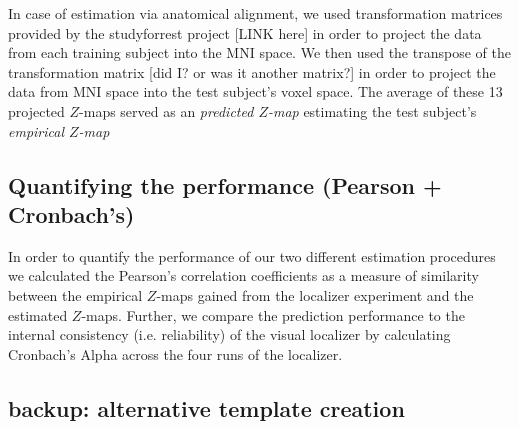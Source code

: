 




In case of estimation via anatomical alignment, we used transformation matrices
provided by the studyforrest project [LINK here] in order to project the data
from each training subject into the MNI space.
%
We then used the transpose of the transformation matrix [did I? or was it
another matrix?] in order to project the data from MNI space into the test
subject's voxel space.
%
The average of these 13 projected $Z$-maps served as an \textit{predicted
$Z$-map} estimating the test subject's \textit{empirical $Z$-map}


\subsection{Quantifying the performance (Pearson + Cronbach's)}

%
In order to quantify the performance of our two different estimation procedures
we calculated the Pearson's correlation coefficients as a measure of similarity
between the empirical $Z$-maps gained from the localizer experiment and the
estimated $Z$-maps.
%
Further, we compare the prediction performance to the internal consistency (i.e.
reliability) of the visual localizer by calculating Cronbach's Alpha across the
four runs of the localizer.




\subsection{backup: alternative template creation}


